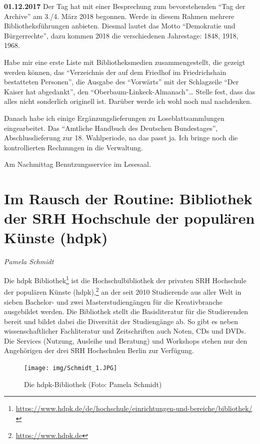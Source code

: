 \documentclass[a4paper,
fontsize=11pt,
oneside,
numbers=noperiodatend,
parskip=half-,
bibliography=totoc,
final
]{scrartcl}
\begin{document}
\textbf{01.12.2017} Der Tag hat mit einer Besprechung zum bevorstehenden
\enquote{Tag der Archive} am 3./4. März 2018 begonnen. Werde in diesem
Rahmen mehrere Bibliotheksführungen anbieten. Diesmal lautet das Motto
\enquote{Demokratie und Bürgerrechte}, dazu kommen 2018 die
verschiedenen Jahrestage: 1848, 1918, 1968.

Habe mir eine erste Liste mit Bibliotheksmedien zusammengestellt, die
gezeigt werden können, das \enquote{Verzeichnis der auf dem Friedhof im
Friedrichshain bestatteten Personen}, die Ausgabe des \enquote{Vorwärts}
mit der Schlagzeile \enquote{Der Kaiser hat abgedankt}, den
\enquote{Oberbaum-Linkeck-Almanach}\ldots{} Stelle fest, dass das alles
nicht sonderlich originell ist. Darüber werde ich wohl noch mal
nachdenken.

Danach habe ich einige Ergänzungslieferungen zu Loseblattsammlungen
eingearbeitet. Das \enquote{Amtliche Handbuch des Deutschen
Bundestages}, Abschlusslieferung zur 18. Wahlperiode, na das passt ja.
Ich bringe noch die kontrollierten Rechnungen in die Verwaltung.

Am Nachmittag Benutzungsservice im Lesesaal.

\hypertarget{im-rausch-der-routine-bibliothek-der-srh-hochschule-der-populuxe4ren-kuxfcnste-hdpk}{%
\section*{Im Rausch der Routine: Bibliothek der SRH Hochschule der
populären Künste
(hdpk)}\label{im-rausch-der-routine-bibliothek-der-srh-hochschule-der-populuxe4ren-kuxfcnste-hdpk}}

\emph{Pamela Schmidt}

Die hdpk Bibliothek\footnote{\url{https://www.hdpk.de/de/hochschule/einrichtungen-und-bereiche/bibliothek/}}
ist die Hochschulbibliothek der privaten SRH Hochschule der populären
Künste (hdpk),\footnote{\url{https://www.hdpk.de}} an der seit 2010
Studierende aus aller Welt in sieben Bachelor- und zwei
Masterstudiengängen für die Kreativbranche ausgebildet werden. Die
Bibliothek stellt die Basisliteratur für die Studierenden bereit und
bildet dabei die Diversität der Studiengänge ab. So gibt es neben
wissenschaftlicher Fachliteratur und Zeitschriften auch Noten, CDs und
DVDs. Die Services (Nutzung, Ausleihe und Beratung) und Workshops stehen
nur den Angehörigen der drei SRH Hochschulen Berlin zur Verfügung.

\begin{figure}
\centering
\texttt{[image: img/Schmidt\_1.JPG]}
\caption{Die hdpk-Bibliothek (Foto: Pamela Schmidt)}
\end{figure}
\end{document}
